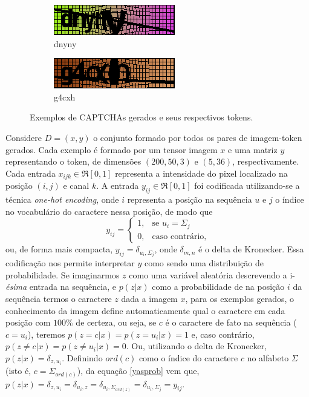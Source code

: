 \begin{figure}[ht]
	\begin{subfigure}{.5\textwidth}
		\centering
		\includegraphics[width=.9\linewidth]{figuras/12248_dnyny.png}
		\caption{dnyny}
	\end{subfigure}
	\begin{subfigure}{.5\textwidth}
		\centering
		\includegraphics[width=.9\linewidth]{figuras/8873_g4cxh.png}
		\caption{g4cxh}
	\end{subfigure}%
	\vspace{.05\linewidth}
	\caption{Exemplos de CAPTCHAs gerados e seus respectivos tokens.}
	\label{imgcaptchas}
\end{figure}

Considere $D = {(x, y)}$ o conjunto formado por todos os pares de imagem-token gerados. Cada exemplo é formado por um tensor imagem $x$ e uma matriz $y$ representando o token, de dimensões $(200, 50, 3)$ e $(5, 36)$, respectivamente. Cada entrada $x_{ijk} \in \Re[0,1]$ representa a intensidade do pixel localizado na posição $(i,j)$ e canal $k$. A entrada $y_{ij} \in \Re[0,1]$ foi codificada utilizando-se a técnica \textit{one-hot encoding}, onde $i$ representa a posição na sequência $u$ e $j$ o índice no vocabulário do caractere nessa posição, de modo que 
\begin{equation}\label{yasprob}
   y_{ij}= 
	\begin{cases}
		1,	& \text{se } u_i = \Sigma_j\\
		0,  & \text{caso contrário,}
	\end{cases}
\end{equation}
ou, de forma mais compacta, $y_{ij} = \delta_{u_i,\Sigma_j}$, onde $\delta_{m,n}$ é o delta de Kronecker. Essa codificação nos permite interpretar $y$ como sendo uma distribuição de probabilidade. Se imaginarmos $z$ como uma variável aleatória descrevendo a i-\textit{ésima} entrada na sequência, e $p(z|x)$ como a probabilidade de na posição $i$ da sequência termos o caractere $z$ dada a imagem $x$, para os exemplos gerados, o conhecimento da imagem define automaticamente qual o caractere em cada posição com $100\%$ de certeza, ou seja, se $c$ é o caractere de fato na sequência ($c = u_i$), teremos $p(z = c|x) = p(z = u_i|x) = 1$ e, caso contrário, $p(z \neq c|x) = p(z \neq u_i|x) = 0$. Ou, utilizando o delta de Kronecker, $p(z|x) = \delta_{z,u_i}$. Definindo $ord(c)$ como o índice do caractere $c$ no alfabeto $\Sigma$ (isto é, $c = \Sigma_{ord{(c)}}$), da equação \ref{yasprob} vem que, $p(z|x) = \delta_{z,u_i} = \delta_{u_i, z} = \delta_{u_i, \Sigma_{ord(z)}} = \delta_{u_i,\Sigma_j} = y_{ij}$.

